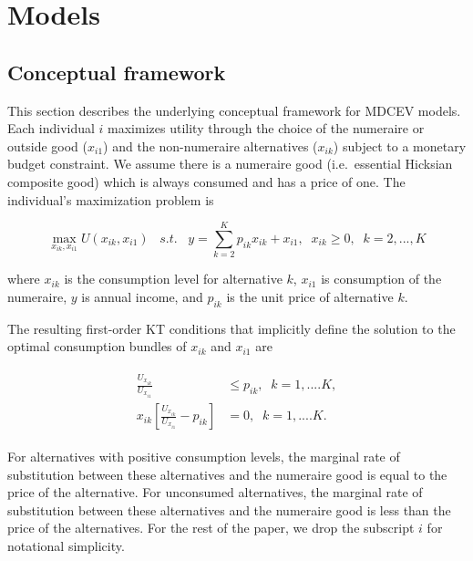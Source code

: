 \hypertarget{models}{%
\section{Models}\label{models}}

\hypertarget{conceptual-framework}{%
\subsection{Conceptual framework}\label{conceptual-framework}}

This section describes the underlying conceptual framework for MDCEV
models. Each individual \(i\) maximizes utility through the choice of
the numeraire or outside good (\(x_{i1}\)) and the non-numeraire
alternatives (\(x_{ik}\)) subject to a monetary budget constraint. We
assume there is a numeraire good (i.e.~essential Hicksian composite
good) which is always consumed and has a price of one. The individual's
maximization problem is

\begin{equation}
\max_{x_{ik}, x_{i1}} U(x_{ik}, x_{i1}) \;\;\; s.t. \;\;\;y = \sum\limits^K_{k=2}p_{ik} x_{ik} + x_{i1}, \;\; x_{ik} \geq 0,\;\; k = 2,...,K  
\end{equation}

\noindent where \(x_{ik}\) is the consumption level for alternative
\(k\), \(x_{i1}\) is consumption of the numeraire, \(y\) is annual
income, and \(p_{ik}\) is the unit price of alternative \(k\).

The resulting first-order KT conditions that implicitly define the
solution to the optimal consumption bundles of \(x_{ik}\) and \(x_{i1}\)
are

\begin{align}
\label{eq:kt_conditions}
\begin{split}
 \frac{U_{x_{ik}}}{U_{x_{i1}}} & \leq p_{ik},\; \; k = 1,....K , \\
  x_{ik}\left[\frac{U_{x_{ik}}}{U_{x_{i1}}} - p_{ik} \right] & = 0,\; \; k = 1,....K.
  \end{split}
\end{align}

For alternatives with positive consumption levels, the marginal rate of
substitution between these alternatives and the numeraire good is equal
to the price of the alternative. For unconsumed alternatives, the
marginal rate of substitution between these alternatives and the
numeraire good is less than the price of the alternatives. For the rest
of the paper, we drop the subscript \(i\) for notational simplicity.

